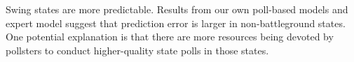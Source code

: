 Swing states are more predictable. Results from our own poll-based models and expert model suggest that prediction error is larger in non-battleground states. One potential explanation is that there are more resources being devoted by pollsters to conduct higher-quality state polls in those states.
